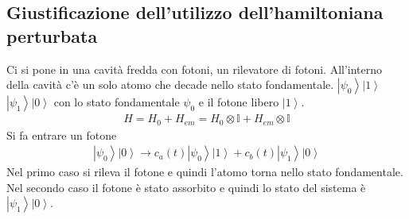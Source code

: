 \subsection{Giustificazione dell'utilizzo dell'hamiltoniana perturbata} %
Ci si pone in una cavità fredda con fotoni, un rilevatore di fotoni. All'interno della cavità c'è un solo atomo che decade nello stato fondamentale. $\left |\psi _0 \right\rangle\left |1 \right\rangle$ $\left |\psi _1 \right\rangle\left |0 \right\rangle$ con lo stato fondamentale $\psi _0$ e il fotone libero $\left |1 \right\rangle$.
\begin{equation}\begin{split}
H=H_0+H_{em}=H_0\otimes\mathbb{I}+H_{em}\otimes\mathbb{I}
\end{split}\end{equation}
Si fa entrare un fotone
\begin{equation}\begin{split}
\left |\psi _0 \right\rangle\left |0 \right\rangle\rightarrow c_a\left(t\right)\left |\psi _0 \right\rangle\left |1 \right\rangle+c_b\left(t\right)\left |\psi _1 \right\rangle\left |0 \right\rangle
\end{split}\end{equation}
Nel primo caso si rileva il fotone e quindi l'atomo torna nello stato fondamentale. Nel secondo caso il fotone è stato assorbito e quindi lo stato del sistema è $\left |\psi _1 \right\rangle\left |0 \right\rangle$.